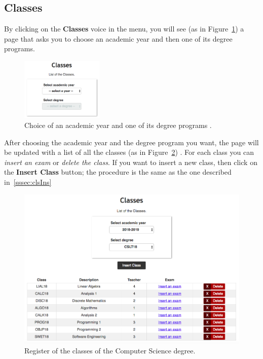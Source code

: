 \subsection{Classes}
By clicking on the \textbf{Classes} voice in the menu, you will see (as in Figure~\ref{fig:chooseClass}) a page that asks you to choose an academic year and then one of its degree programs.
\begin{figure}[!h]
	\centering
	\includegraphics[width=0.35\textwidth]{img/chooseClass.png}
	\caption{Choice of an academic year and one of its degree programs .}
	\label{fig:chooseClass}
\end{figure}

After choosing the academic year and the degree program you want, the page will be updated with a list of all the classes (as in Figure~\ref{fig:classes}) . For each class you can \emph{insert an exam}  or \emph{delete the class}. If you want to insert a new class, then click on the \textbf{Insert Class} button; the procedure is the same as the one described in~\ref{sssec:clsIns}
\begin{figure}[!h]
	\centering
	\includegraphics[width=1.0\textwidth]{img/classes.png}
	\caption{Register of the classes of the Computer Science degree.}
	\label{fig:classes}
\end{figure}


